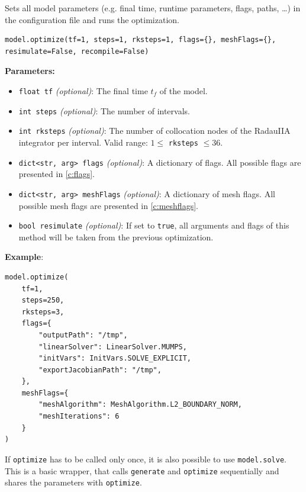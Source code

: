 \documentclass[12pt]{article}
\begin{document}
\begin{mdframed}[backgroundcolor=gray!10, roundcorner=10pt,
		linewidth=1pt]

	Sets all model parameters (e.g. final time, runtime parameters, flags,
	paths, \ldots) in the configuration file and runs the optimization.

	\begin{lstlisting}
model.optimize(tf=1, steps=1, rksteps=1, flags={}, meshFlags={}, resimulate=False, recompile=False)
	\end{lstlisting}
	\label{optimize}
	\textbf{Parameters:}
	\begin{itemize}
		\item \texttt{float tf} \emph{(optional)}: The final time $t_f$
		      of the model.
		\item \texttt{int steps} \emph{(optional)}: The number of
		      intervals.
		\item \texttt{int rksteps} \emph{(optional)}: The number of
		      collocation nodes of the RadauIIA integrator per interval. Valid range: $1
			      \leq$ \texttt{rksteps} $\leq 36$.
		\item \texttt{dict<str, arg> flags} \emph{(optional)}: A
		      dictionary of flags. All possible flags are presented in \eqref{c:flags}.
		\item \texttt{dict<str, arg> meshFlags} \emph{(optional)}: A
		      dictionary of mesh flags. All possible mesh flags are presented in
		      \eqref{c:meshflags}.
		\item \texttt{bool resimulate} \emph{(optional)}: If set to
		      \texttt{true}, all arguments and flags of this method will be taken from the
		      previous optimization.
	\end{itemize}

	\textbf{Example}:
	\begin{lstlisting}
model.optimize(
	tf=1,
	steps=250,
	rksteps=3,
	flags={
		"outputPath": "/tmp",
		"linearSolver": LinearSolver.MUMPS,
		"initVars": InitVars.SOLVE_EXPLICIT,
		"exportJacobianPath": "/tmp",
	},
	meshFlags={
		"meshAlgorithm": MeshAlgorithm.L2_BOUNDARY_NORM,
		"meshIterations": 6
	}
)
	\end{lstlisting}

\end{mdframed}

If \texttt{optimize} has to be called only once, it is also possible to use
\texttt{model.solve}. This is a basic wrapper, that calls \texttt{generate} and
\texttt{optimize} sequentially and shares the parameters with
\texttt{optimize}.
\end{document}
